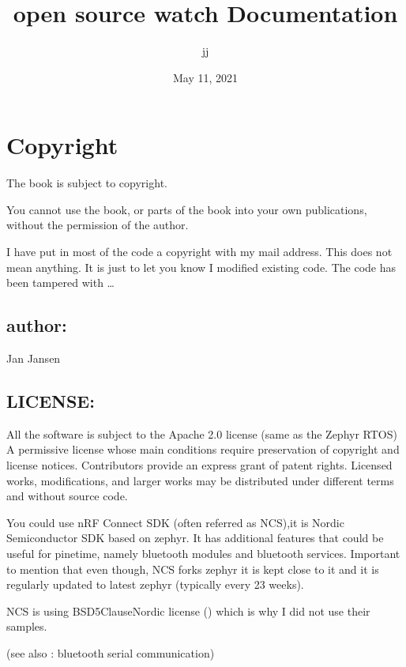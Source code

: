 \documentclass[letterpaper,10pt,english]{sphinxmanual}
\title{open source watch Documentation}
\date{May 11, 2021}
\author{jj}
\begin{document}
\pagestyle{empty}
\sphinxmaketitle
\pagestyle{plain}
\sphinxtableofcontents
\pagestyle{normal}
\label{\detokenize{index::doc}}
\noindent{}




\chapter{Copyright}
\label{\detokenize{copyright:copyright}}\label{\detokenize{copyright::doc}}
The book is subject to copyright.

You cannot use the book, or parts of the book into your own publications, without the permission of the author.

I have put in most of the code a copyright with my mail address.
This does not mean anything. It is just to let you know I modified existing code. The code has been tampered with …


\section{author:}
\label{\detokenize{copyright:author}}
Jan Jansen


\section{LICENSE:}
\label{\detokenize{copyright:license}}
All the software is subject to the Apache 2.0 license (same as the Zephyr RTOS)
A permissive license whose main conditions require preservation of copyright and license notices. Contributors provide an express grant of patent rights. Licensed works, modifications, and larger works may be distributed under different terms and without source code.

You could use nRF Connect SDK (often referred as NCS),it is Nordic Semiconductor SDK based on zephyr. It has additional features that could be useful for pinetime, namely bluetooth modules and bluetooth services. Important to mention that even though, NCS forks zephyr it is kept close to it and it is regularly updated to latest zephyr (typically every 2\sphinxhyphen{}3 weeks).

NCS is using BSD\sphinxhyphen{}5\sphinxhyphen{}Clause\sphinxhyphen{}Nordic license ()
which is why I did not use their samples.

(see also : bluetooth serial communication)
\end{document}
